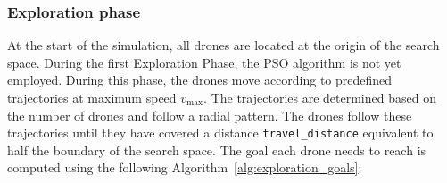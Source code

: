\subsubsection{Exploration phase}
At the start of the simulation, all drones are located at the origin of the search space.
During the first Exploration Phase, the PSO algorithm is not yet employed. 
During this phase, the drones move according to predefined trajectories at maximum speed $v_{\text{max}}$. 
The trajectories are determined based on the number of drones and follow a radial pattern.%
The drones follow these trajectories until they have covered a distance \texttt{travel\_distance} equivalent to half the boundary of the search space.
The goal each drone needs to reach is computed using the following Algorithm~\ref{alg:exploration_goals}:
\newcommand{\forcond}{drone $j=1$ \KwTo $m$}
